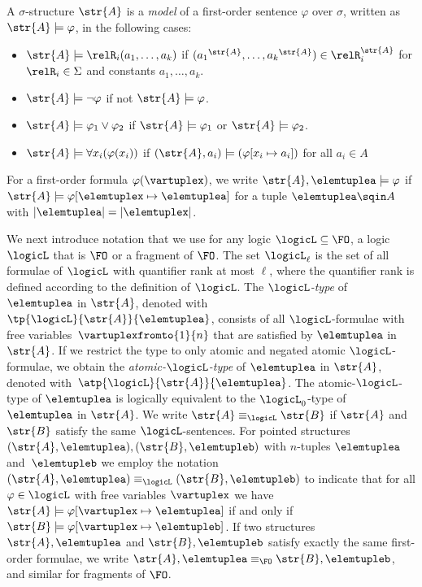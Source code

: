 \begin{definition}
  A $\sigma$-structure $\str{A}$ is a \emph{model} of a first-order sentence $\varphi$ over $\sigma$, written as $\str{A} \models \varphi$, in the following cases:
\begin{itemize}
  \item $\str{A} \models \relR_{i}(a_{1}, \ldots, a_{k})$ if $({a_{1}}^{\str{A}}, \ldots, {a_{k}}^{\str{A}}) \in \relR_{i}^{\str{A}}$ for $\relR_{i} \in \Sigma$ and constants $a_{1}, \ldots, a_{k}$.
  \item $\str{A} \models \neg \varphi$ if not $\str{A} \models \varphi$.
  \item $\str{A} \models \varphi_{1} \lor \varphi_{2}$ if $\str{A} \models \varphi_{1}$ or $\str{A} \models \varphi_{2}$.
  \item $\str{A} \models \forall{x_{i}} (\varphi(x_{i}))$ if $(\str{A}, a_{i}) \models (\varphi[x_{i} \mapsto a_{i}])$ for all $a_{i} \in A$
\end{itemize}
For a first-order formula $\varphi(\vartuplex)$, we write $\str{A}, \elemtuplea \models \varphi$ if $\str{A} \models \varphi[\elemtuplex \mapsto \elemtuplea]$ for a tuple $\elemtuplea \sqin A$ with $|\elemtuplea| = |\elemtuplex|$.
\end{definition}

We next introduce notation that we use for any logic $\logicL \subseteq \FO$, \ie{} a logic $\logicL$ that is $\FO$ or a fragment of $\FO$.
The set $\logicL_{\ell}$ is the set of all formulae of $\logicL$ with quantifier rank at most $\ell$, where the quantifier rank is defined according to the definition of $\logicL$.
The \emph{$\logicL$-type} of $\elemtuplea$ in $\str{A}$, denoted with~$\tp{\logicL}{\str{A}}{\elemtuplea}$, consists of all $\logicL$-formulae with free variables~$\vartuplexfromto{1}{n}$ that are satisfied by $\elemtuplea$ in $\str{A}$.
If we restrict the type to only atomic and negated atomic $\logicL$-formulae, we obtain the \emph{atomic-$\logicL$-type} of $\elemtuplea$ in $\str{A}$, denoted with~$\atp{\logicL}{\str{A}}{\elemtuplea}$.
The atomic-$\logicL$-type of $\elemtuplea$ is logically equivalent to the $\logicL_{0}$-type of $\elemtuplea$ in $\str{A}$.
We write $\str{A} \equiv_\logicL \str{B}$ if $\str{A}$ and~$\str{B}$ satisfy the same $\logicL$-sentences.
For pointed structures $(\str{A}, \elemtuplea), (\str{B}, \elemtupleb)$ with $n$-tuples $\elemtuplea$ and~$\elemtupleb$ we employ the notation $(\str{A}, \elemtuplea) \equiv_\logicL (\str{B}, \elemtupleb)$ to indicate that for all $\varphi \in \logicL$ with free variables $\vartuplex$ we have $\str{A} \models \varphi[\vartuplex \mapsto \elemtuplea]$ if and only if $\str{B} \models \varphi[\vartuplex \mapsto \elemtupleb]$.
If two structures $\str{A}, \elemtuplea$ and $\str{B}, \elemtupleb$ satisfy exactly the same first-order formulae, we write $\str{A}, \elemtuplea \equiv_{\FO} \str{B}, \elemtupleb$, and similar for fragments of $\FO$.

